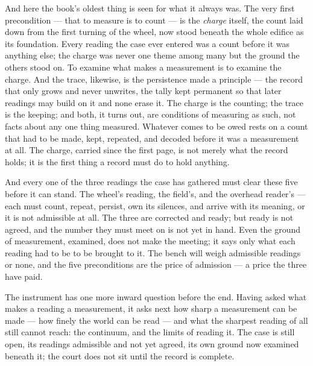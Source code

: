 And here the book's oldest thing is seen for what it always was. The very first precondition --- that to measure
is to count --- is the \emph{charge} itself, the count laid down from the first turning of the wheel, now stood
beneath the whole edifice as its foundation. Every reading the case ever entered was a count before it was
anything else; the charge was never one theme among many but the ground the others stood on. To examine what
makes a measurement is to examine the charge. And the trace, likewise, is the persistence made a principle ---
the record that only grows and never unwrites, the tally kept permanent so that later readings may build on it
and none erase it. The charge is the counting; the trace is the keeping; and both, it turns out, are conditions
of measuring as such, not facts about any one thing measured. Whatever comes to be owed rests on a count that
had to be made, kept, repeated, and decoded before it was a measurement at all. The charge, carried since the
first page, is not merely what the record holds; it is the first thing a record must do to hold anything.

And every one of the three readings the case has gathered must clear these five before it can stand. The
wheel's reading, the field's, and the overhead reader's --- each must count, repeat, persist, own its silences,
and arrive with its meaning, or it is not admissible at all. The three are corrected and ready; but ready is not
agreed, and the number they must meet on is not yet in hand. Even the ground of measurement, examined, does not
make the meeting; it says only what each reading had to be to be brought to it. The bench will weigh admissible
readings or none, and the five preconditions are the price of admission --- a price the three have paid.

The instrument has one more inward question before the end. Having asked what makes a reading a measurement, it
asks next how sharp a measurement can be made --- how finely the world can be read --- and what the sharpest
reading of all still cannot reach: the continuum, and the limits of reading it. The case is still open, its readings
admissible and not yet agreed, its own ground now examined beneath it; the court does not sit until the record
is complete.


